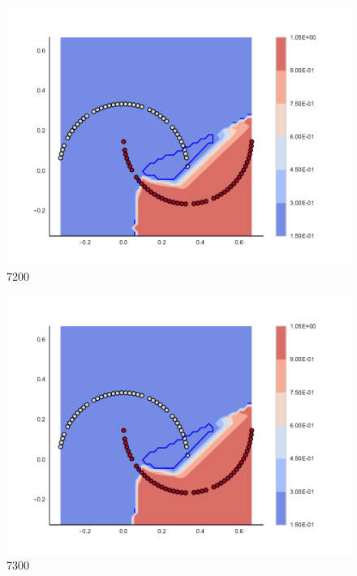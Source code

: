 \begin{subfigure}[b]{0.09\textwidth}
    \includegraphics[clip, trim=2.35cm 1.75cm 4.5cm 0cm,width=\textwidth]{img/convergence/7200.pdf}
    \caption{7200}
    \label{fig:convergence_7200}
\end{subfigure}
%
\begin{subfigure}[b]{0.09\textwidth}
    \includegraphics[clip, trim=2.35cm 1.75cm 4.5cm 0cm,width=\textwidth]{img/convergence/7300.pdf}
    \caption{7300}
    \label{fig:convergence_7300}
\end{subfigure}
%
